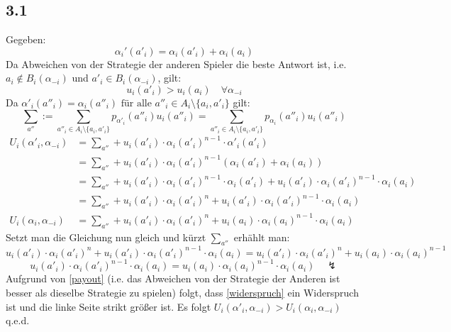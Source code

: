 \documentclass[a4paper,
  twoside, %
  headlines=2.1 %
  ]{scrartcl}
\begin{document}
\subsection*{3.1}
Gegeben:
\begin{equation}\label{vor}
    \alpha_i'(a'_i)=\alpha_i(a'_i)+\alpha_i(a_i) 
\end{equation}
Da Abweichen von der Strategie der anderen Spieler die beste Antwort ist, i.e. $a_i \notin B_i(\alpha_{-i})$ und $a'_i \in B_i(\alpha_{-i})$, gilt:\\
\begin{equation}\label{payout}
    u_i(a'_i)>u_i(a_i) \quad  \forall \alpha_{-i}
\end{equation}
Da 
$\alpha'_i(a''_i) = \alpha_i(a''_i) \text{ für alle } a''_i \in A_i \setminus \{a_i, a'_i\}$
gilt:
\begin{equation}
    \sum_ {a''} := \sum_{a''_i\in A_i \setminus \{a_i, a'_i\}} p_{\alpha'_i}(a''_i) u_i(a''_i) = \sum_{a''_i\in A_i \setminus \{a_i, a'_i\}} p_{\alpha_i}(a''_i) u_i(a''_i)
\end{equation}
\begin{align}
    U_i(\alpha'_i,\alpha_{-i}) &=  \sum_ {a''} + u_i(a'_i) \cdot \alpha_i (a'_i)^{n-1} \cdot \alpha'_i(a'_i) \\
    &= \sum_ {a''} + u_i(a'_i) \cdot \alpha_i (a'_i)^{n-1} (\alpha_i(a'_i) + \alpha_i (a_i)) \\
    &= \sum_ {a''} + u_i(a'_i) \cdot \alpha_i (a'_i)^{n-1} \cdot \alpha_i(a'_i) +u_i(a'_i) \cdot \alpha_i (a'_i)^{n-1} \cdot \alpha_i (a_i) \\
    &= \sum_ {a''} + u_i(a'_i) \cdot \alpha_i (a'_i)^{n}  +u_i(a'_i) \cdot \alpha_i (a'_i)^{n-1} \cdot \alpha_i (a_i)
    \\
    U_i(\alpha_i,\alpha_{-i}) &=  \sum_{a''} + u_i(a'_i) \cdot \alpha_i (a'_i)^{n} + u_i(a_i) \cdot \alpha_i(a_i)^{n-1} \cdot \alpha_i(a_i)
\end{align}
Setzt man die Gleichung nun gleich und kürzt $\sum_ {a''}$ erhählt man:
\begin{equation}
        u_i(a'_i) \cdot \alpha_i (a'_i)^{n}  +u_i(a'_i) \cdot \alpha_i (a'_i)^{n-1} \cdot \alpha_i (a_i) = u_i(a'_i) \cdot \alpha_i (a'_i)^{n} + u_i(a_i) \cdot \alpha_i(a_i)^{n-1} 
\end{equation}
\begin{equation}\label{widerspruch}
        u_i(a'_i) \cdot \alpha_i (a'_i)^{n-1} \cdot \alpha_i (a_i) = u_i(a_i) \cdot \alpha_i(a_i)^{n-1} \cdot \alpha_i(a_i) \quad \lightning
\end{equation}
Aufgrund von \eqref{payout} (i.e. das Abweichen von der Strategie der Anderen ist besser als dieselbe Strategie zu spielen) folgt, dass \eqref{widerspruch} ein Widerspruch ist und die linke Seite strikt größer ist. Es folgt $U_i(\alpha'_i,\alpha_{-i}) > U_i(\alpha_i,\alpha_{-i})$ q.e.d.
\end{document}
